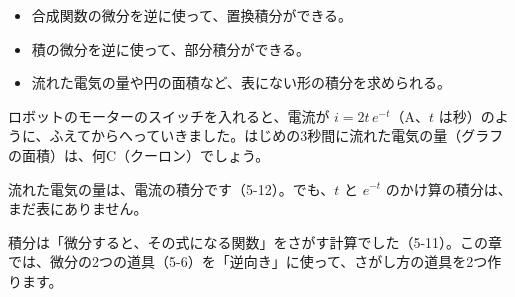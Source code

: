 \newcommand\bkvpmidashi[1]{\par\Needspace{6\baselineskip}\noindent\textbf{#1}\par}

\begin{goal}
\begin{itemize}[label={\color{bkTheme}●}, leftmargin=1.6\zw, itemsep=0pt, topsep=1pt]
\item {}\enspace 合成関数の微分を逆に使って、置換積分ができる。
\item {}\enspace 積の微分を逆に使って、部分積分ができる。
\item {}\enspace 流れた電気の量や円の面積など、表にない形の積分を求められる。
\end{itemize}
\end{goal}

\begin{hatena}
\noindent\begin{minipage}[c]{0.535\linewidth}
ロボットのモーターのスイッチを入れると、電流が $i=2t\,e^{-t}$（A、$t$ は秒）のように、ふえてからへっていきました。はじめの3秒間に流れた電気の量（グラフの面積）は、何C（クーロン）でしょう。

流れた電気の量は、電流の積分です（5-12）。でも、$t$ と $e^{-t}$ のかけ算の積分は、まだ表にありません。
\end{minipage}\hfill
\begin{minipage}[c]{0.425\linewidth}
\end{minipage}
\end{hatena}

積分は「微分すると、その式になる関数」をさがす計算でした（5-11）。この章では、微分の2つの道具（5-6）を「逆向き」に使って、さがし方の道具を2つ作ります。

